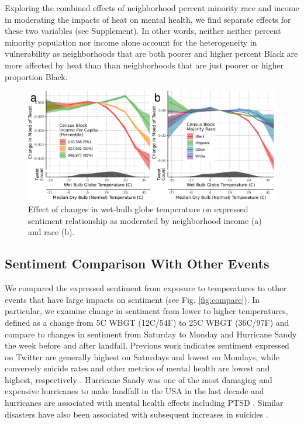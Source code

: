 \documentclass[fleqn,10pt]{wlscirep}
\begin{document}
Exploring the combined effects of neighborhood percent minority race and income in moderating the impacts of heat on mental health, we find separate effects for these two variables (see Supplement). In other words, neither neither percent minority population nor income alone account for the heterogeneity in vulnerability as neighborhoods that are both poorer and higher percent Black are more affected by heat than than neighborhoods that are just poorer or higher proportion Black.

\begin{figure}[H]
\centering
  \includegraphics[width=\linewidth]{../res/wbgt_combined.png}
    \caption{Effect of changes in wet-bulb globe temperature on expressed sentiment relationship as moderated by neighborhood income (a) and race (b).}
\label{fig:hetero}
\end{figure}


\subsection*{Sentiment Comparison With Other Events}
We compared the expressed sentiment from exposure to temperatures to other events that have large impacts on sentiment (see Fig. \ref{fig:compare}). In particular, we examine change in sentiment from lower to higher temperatures, defined as a change from 5\textdegree C WBGT (12\textdegree C/54\textdegree F) to 25\textdegree C WBGT (36\textdegree C/97\textdegree F) and compare to changes in sentiment from Saturday to Monday and Hurricane Sandy the week before and after landfall. Previous work indicates sentiment expressed on Twitter are generally highest on Saturdays and lowest on Mondays, while conversely suicide rates and other metrics of mental health are lowest and highest, respectively \cite{CDC2021}. Hurricane Sandy was one of the most damaging and expensive hurricanes to make landfall in the USA in the last decade and hurricanes are associated with mental health effects including PTSD \cite{Schwartz2017Aug, Schwartz2018May}. Similar disasters have also been associated with subsequent increases in suicides \cite{Krug1998Feb}.
\end{document}
